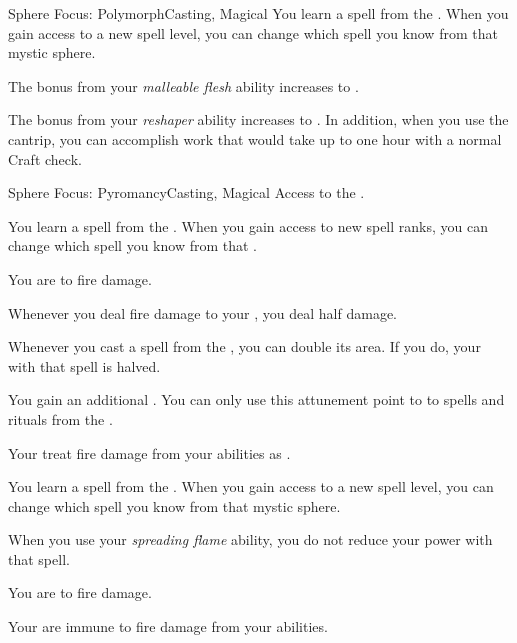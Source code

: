 \begin{feat}{Sphere Focus: Polymorph}{Casting, Magical}
         You learn a spell from the  .
        When you gain access to a new spell level, you can change which spell you know from that mystic sphere.

         The bonus from your \textit{malleable flesh} ability increases to .

         The bonus from your \textit{reshaper} ability increases to .
        In addition, when you use the  cantrip, you can accomplish work that would take up to one hour with a normal Craft check.
    \end{feat}

    \begin{feat}{Sphere Focus: Pyromancy}{Casting, Magical}
        \featpre Access to the  .

         You learn a spell from the  .
        When you gain access to new spell ranks, you can change which spell you know from that .

         You are  to fire damage.

         Whenever you deal fire damage to your , you deal half damage.

         Whenever you cast a spell from the  , you can double its area.
        If you do, your  with that spell is halved.

         You gain an additional .
        You can only use this attunement point to  to spells and rituals from the  .

         Your  treat fire damage from your abilities as .

         You learn a spell from the  .
        When you gain access to a new spell level, you can change which spell you know from that mystic sphere.

         When you use your \textit{spreading flame} ability, you do not reduce your power with that spell.

         You are  to fire damage.

         Your  are immune to fire damage from your abilities.
    \end{feat}


